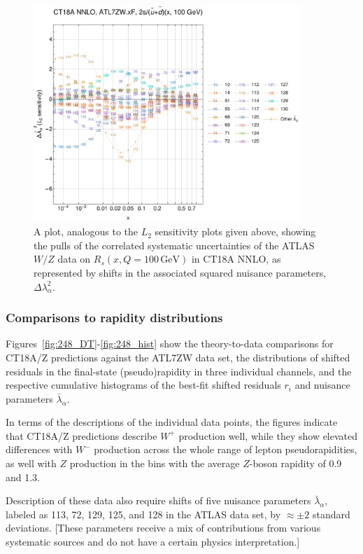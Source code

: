 \begin{figure}[tb]
\includegraphics[width=0.9\textwidth]{fig/ATL7WZ/248rat_ifl5_lam_ct18Ann_lambda_q100.pdf}
	\caption{
		A plot, analogous to the $L_2$ sensitivity plots given above, showing the pulls of the correlated systematic uncertainties of the ATLAS $W/Z$ data
		on $R_s(x,Q=100\,\mathrm{GeV})$ in CT18A NNLO, as represented by shifts in the associated squared nuisance parameters, $\Delta \lambda^2_\alpha$.
	}
\label{fig:248_l2nui}
\end{figure}

\subsubsection{Comparisons to rapidity distributions}
\label{sec:ATL7ZWrap}

Figures~\ref{fig:248_DT}-\ref{fig:248_hist} show the theory-to-data
comparisons for CT18A/Z predictions against the ATL7ZW data set, the
distributions of shifted residuals in the final-state (pseudo)rapidity in
three individual channels, and the respective
cumulative histograms of the best-fit shifted
residuals $r_i$ and nuisance parameters $\bar\lambda_\alpha$.

In terms of the descriptions of the individual data points, the
figures indicate that CT18A/Z predictions describe $W^+$ production
well, while they show elevated differences with $W^-$ production
across the whole range of lepton pseudorapidities, as well with $Z$
production in the bins with the average $Z$-boson rapidity of 0.9 and 1.3.

Description of these data also require shifts of five nuisance
parameters $\bar \lambda_\alpha$,
labeled as 113, 72, 129, 125, and 128 in the ATLAS
data set, by $\approx \pm 2$ standard deviations. [These parameters
receive a mix of contributions from various systematic sources and
do not have a certain physics interpretation.]

